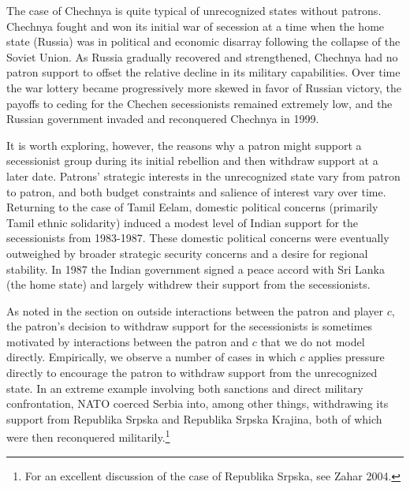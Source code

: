 \documentclass[11pt,letterpaper, notitlepage]{article}
\begin{document}
The case of Chechnya is quite typical of unrecognized states without patrons. Chechnya fought and won its initial war of secession at a time when the home state (Russia) was in political and economic disarray following the collapse of the Soviet Union. As Russia gradually recovered and strengthened, Chechnya had no patron support to offset the relative decline in its military capabilities. Over time the war lottery became progressively more skewed in favor of Russian victory, the payoffs to ceding for the Chechen secessionists remained extremely low, and the Russian government invaded and reconquered Chechnya in 1999.

It is worth exploring, however, the reasons why a patron might support a secessionist group during its initial rebellion and then withdraw support at a later date. Patrons' strategic interests in the unrecognized state vary from patron to patron, and both budget constraints and salience of interest vary over time. Returning to the case of Tamil Eelam, domestic political concerns (primarily Tamil ethnic solidarity) induced a modest level of Indian support for the secessionists  from 1983-1987. These domestic political concerns were eventually outweighed by broader strategic security concerns and a desire for regional stability. In 1987 the Indian government signed a peace accord with Sri Lanka (the home state) and largely withdrew their support from the secessionists.


As noted in the section on outside interactions between the patron and player $c$, the patron's decision to withdraw support for the secessionists is sometimes motivated by interactions between the patron and $c$ that we do not model directly. Empirically, we observe a number of cases in which $c$ applies pressure directly to encourage the patron to withdraw support from the unrecognized state. In an extreme example involving both sanctions and direct military confrontation, NATO coerced Serbia into, among other things, withdrawing its support from Republika Srpska and Republika Srpska Krajina, both of which were then reconquered militarily.\footnote{For an excellent discussion of the case of Republika Srpska, see Zahar 2004.} %
\end{document}
